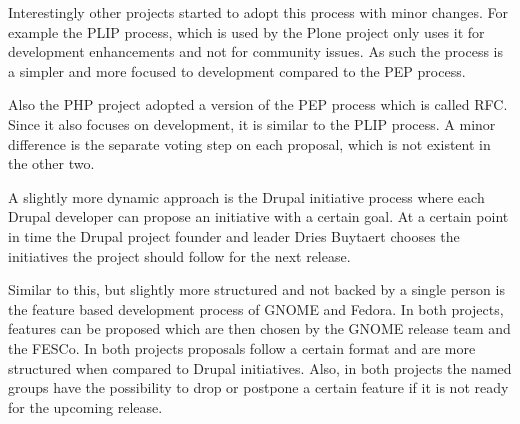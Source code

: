 Interestingly other projects started to adopt this process with minor changes.
For example the \ac{PLIP} process, which is used by the Plone project only uses
it for development enhancements and not for community issues. As such the
process is a simpler and more focused to development compared to the \ac{PEP}
process.

Also the PHP project adopted a version of the \ac{PEP} process which is called
\ac{RFC}. Since it also focuses on development, it is similar to the \ac{PLIP}
process. A minor difference is the separate voting step on each proposal, which
is not existent in the other two.

A slightly more dynamic approach is the Drupal initiative process where each Drupal
developer can propose an initiative with a certain goal. At a certain point in
time the Drupal project founder and leader Dries Buytaert chooses the
initiatives the project should follow for the next release.

Similar to this, but slightly more structured and not backed by a single person
is the feature based development process of GNOME and Fedora. In both projects,
features can be proposed which are then chosen by the GNOME release team and
the \ac{FESCo}. In both projects proposals follow a certain format and are more
structured when compared to Drupal initiatives. Also, in both projects the
named groups have the possibility to drop or postpone a certain feature if it
is not ready for the upcoming release.

